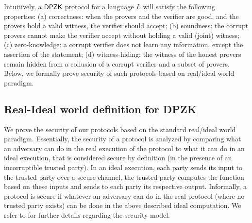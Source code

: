 Intuitively, a $\mathsf{DPZK}$ protocol for a language $L$ will satisfy the following properties: (a)  correctness:  when the provers and the verifier are good, and  the provers hold a valid witness, the verifier should accept; (b) soundness:  the corrupt provers cannot make the verifier accept without holding a valid (joint) witness; (c) zero-knowledge: a corrupt verifier does not learn any information, except  the assertion of the statement; (d)  witness-hiding: the witness of the honest provers remain hidden from a collusion of a corrupt verifier and a subset of provers. Below, we formally prove security of such protocols based on real/ideal world paradigm. 

\subsection{Real-Ideal world definition for DPZK}

We prove the security of our protocols based on the standard real/ideal world paradigm.  Essentially, the security of a protocol is analyzed by comparing what an adversary can do in the real execution of the protocol to what it can do in an ideal execution,  that is considered secure by definition (in the presence of an incorruptible trusted party). In an ideal execution, each party sends its input to the trusted party over a secure channel, the trusted party computes the function based on these inputs and sends to each party its respective output.  Informally, a protocol
is secure if whatever an adversary can do in the real protocol (where no trusted party exists) can be done in the above described ideal computation. We refer to \cite{Canetti00,Goldreich2001,Lindell17,CohenL14} for further details regarding the security model.  


